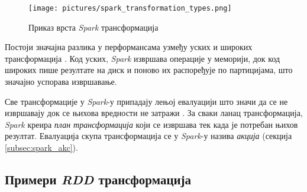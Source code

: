 \documentclass[12pt,oneside]{memoir}
\begin{document}
\begin{figure}[!ht]
  \centering
  \texttt{[image: pictures/spark\_transformation\_types.png]}
  \caption{Приказ врста \textit{Spark} трансформација}
  \label{fig:sprk_trnsf}
\end{figure}

Постоји значајна разлика у перформансама узмеђу уских и широких трансформација \cite{spark_guide}. Код уских, \textit{Spark} извршава операције у меморији, док код широких пише резултате на диск и поново их распоређује по партицијама, што значајно успорава извршавање.

Све трансформације у \textit{Spark}-у припадају лењој евалуацији што значи да се не извршавају док се њихова вредности не затражи \cite{spark_guide}. За сваки ланац трансформација, \textit{Spark} креира \textit{план трансформација} који се извршава тек када је потребан њихов резултат. Евалуација скупа трансформација се у \textit{Spark}-у назива \textit{акција} (секција \ref{subsec:spark_akc}).




\subsection{Примери \textit{RDD} трансформација}
\label{subsec:spark_transformation_types}
\end{document}
